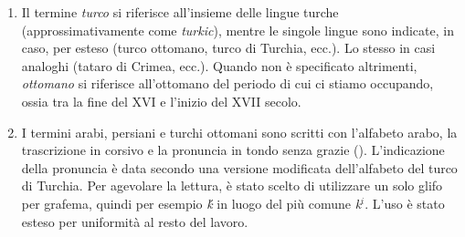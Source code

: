 \startnote

\begin{enumerate}






\item  Il termine {\it  turco} si  riferisce all'insieme  delle lingue
  turche  (approssimativamente come {\it  turkic}), mentre  le singole
  lingue sono indicate, in caso,  per esteso (turco ottomano, turco di
  Turchia,  ecc.).  Lo  stesso  in casi  analoghi  (tataro di  Crimea,
  ecc.).  Quando  non  è  specificato altrimenti,  {\it  ottomano}  si
  riferisce all'ottomano del periodo di cui ci stiamo occupando, ossia
  tra la fine del XVI e l'inizio del XVII secolo.

\item I  termini arabi,  persiani e turchi  ottomani sono  scritti con
  l'alfabeto arabo, la trascrizione in corsivo e la pronuncia in tondo
  senza  grazie    (\vedi   {}).
  L'indicazione della pronuncia è data secondo una versione modificata
  dell'alfabeto  del turco di  Turchia.  Per  agevolare la  lettura, è
  stato scelto  di utilizzare  un solo glifo  per grafema,  quindi per
  esempio {\it ḱ}  in luogo del più comune {\it  k$^i$}. L'uso è stato
  esteso per uniformità al resto del lavoro.


\end{enumerate}
